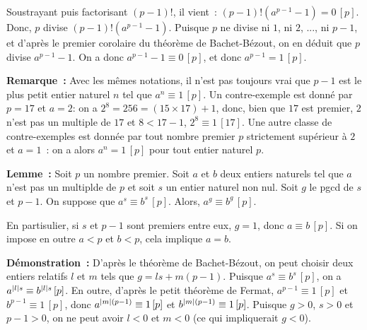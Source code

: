 Soustrayant puis factorisant $(p-1)!$, il vient : $(p-1)! \left( a^{p-1} - 1 \right) = 0 \, [p]$. 
Donc, $p$ divise $(p-1)! \left( a^{p-1} - 1 \right)$. 
Puisque $p$ ne divise ni $1$, ni $2$, ..., ni $p-1$, et d'après le premier corolaire du théorème de Bachet-Bézout, on en déduit que $p$ divise $a^{p-1} - 1$. 
On a donc $a^{p-1} - 1 \equiv 0 \, [p]$, et donc $a^{p-1} = 1 \, [p]$.

\done

\medskip

\noindent\textbf{Remarque :} Avec les mêmes notations, il n'est pas toujours vrai que $p-1$ est le plus petit entier naturel $n$ tel que $a^n \equiv 1 \, [p]$.
    Un contre-exemple est donné par $p = 17$ et $a = 2$: on a $2^8 = 256 = (15 \times 17) + 1$, donc, bien que $17$ est premier, $2$ n'est pas un multiple de $17$ et $8 < 17 - 1$, $2^8 \equiv 1 \, [17]$. 
    Une autre classe de contre-exemples est donnée par tout nombre premier $p$ strictement supérieur à $2$ et $a = 1$ : on a alors $a^n = 1 \, [p]$ pour tout entier naturel $p$.

\medskip

\noindent\textbf{Lemme :} Soit $p$ un nombre premier. 
    Soit $a$ et $b$ deux entiers naturels tel que $a$ n'est pas un multiplde de $p$ et soit $s$ un entier naturel non nul.
    Soit $g$ le pgcd de $s$ et $p-1$.
    On suppose que $a^s \equiv b^s \, [p]$.
    Alors, $a^g \equiv b^g \, [p]$.

    En partisulier, si $s$ et $p-1$ sont premiers entre eux, $g = 1$, donc $a \equiv b \, [p]$.
    Si on impose en outre $a < p$ et $b < p$, cela implique $a = b$.

\medskip

\noindent\textbf{Démonstration :} 
D'après le théorème de Bachet-Bézout, on peut choisir deux entiers relatifs $l$ et $m$ tels que $g = l s + m (p-1)$. 
Puisque $a^s \equiv b^s \, [p]$, on a $a^{\left\lvert l \right\rvert s} \equiv b^{\left\lvert l \right\rvert s} \, [p]$.
En outre, d'après le petit théorème de Fermat, $a^{p-1} \equiv 1 \, [p]$ et $b^{p-1} \equiv 1 \, [p]$, donc $a^{\left\lvert m \right\rvert (p-1)} \equiv 1 \, [p]$ et $b^{\left\lvert m \right\rvert (p-1)} \equiv 1 \, [p]$.
Puisque $g > 0$, $s > 0$ et $p-1 > 0$, on ne peut avoir $l < 0$ et $m < 0$ (ce qui impliquerait $g < 0$).

